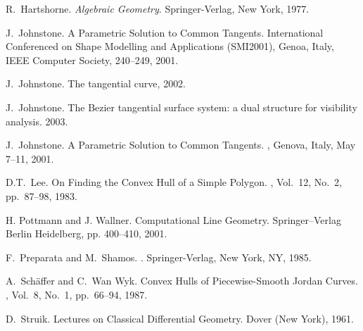 \documentclass[doublespacing]{elsart}
\begin{document}
\begin{thebibliography}{}
R.~Hartshorne.
{\em Algebraic Geometry}. Springer-Verlag, New York, 1977.

J.~Johnstone.
A Parametric Solution to Common Tangents.
International Conferenced on Shape Modelling and Applications (SMI2001),
Genoa, Italy, IEEE Computer Society, 240--249, 2001.

J.~Johnstone.
The tangential curve, 2002.

J.~Johnstone.
The Bezier tangential surface system: a dual structure for visibility analysis.
2003.

J.~Johnstone.
\newblock A Parametric Solution to Common Tangents.
,
Genova, Italy, May 7--11, 2001.

D.T.~Lee.
\newblock On Finding the Convex Hull of a Simple Polygon.
,
Vol.~12, No.~2, pp.~87--98, 1983.

H. Pottmann and J. Wallner.
\newblock Computational Line Geometry.
\newblock Springer--Verlag Berlin Heidelberg, pp. 400--410, 2001.

F.~Preparata and M.~Shamos.
.
\newblock Springer-Verlag, New York, NY, 1985.

A.~Sch\"affer and C.~Wan Wyk.
\newblock Convex Hulls of Piecewise-Smooth Jordan Curves.
, Vol.~8, No.~1, pp.~66--94, 1987.

D.~Struik.
Lectures on Classical Differential Geometry.
Dover (New York), 1961.

\end{thebibliography}

\end{document}
